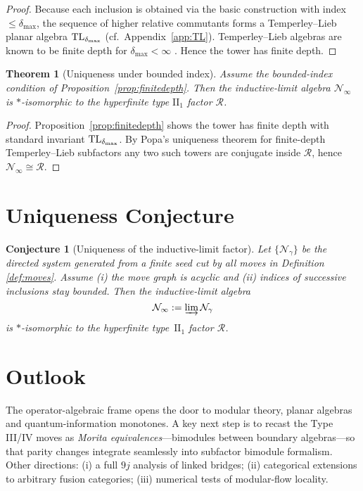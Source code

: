 \documentclass[11pt]{article}
\newtheorem{theorem}{Theorem}[section]
\newtheorem{conjecture}{Conjecture}[section]
\begin{document}
\begin{proof}
Because each inclusion is obtained via the basic construction with
index $\le\delta_{\max}$, the sequence of higher relative commutants
forms a Temperley--Lieb planar algebra ${\rm TL}_{\delta_{\max}}$
(cf.\ Appendix~\ref{app:TL}).  
Temperley--Lieb algebras are known to be finite depth for 
$\delta_{\max}\!<\!\infty$ \cite[Prop.~2.2]{JonesTL}.  Hence the tower
has finite depth.
\end{proof}

\begin{theorem}[Uniqueness under bounded index]\label{thm:unique}
Assume the bounded-index condition of Proposition~\ref{prop:finitedepth}.
Then the inductive-limit algebra $\mathcal N_{\infty}$ is
$*$-isomorphic to the hyperfinite type $\mathrm{II}_1$ factor
$\mathcal R$.
\end{theorem}

\begin{proof}
Proposition~\ref{prop:finitedepth} shows the tower has finite depth with
standard invariant ${\rm TL}_{\delta_{\max}}$.
By Popa’s uniqueness theorem for finite-depth Temperley–Lieb
subfactors \cite{PopaCBMS} any two such towers are conjugate inside
$\mathcal R$, hence $\mathcal N_{\infty}\cong\mathcal R$.
\end{proof}

\section{Uniqueness Conjecture}

\begin{conjecture}[Uniqueness of the inductive-limit factor]\label{conj:unique}
Let $\{\mathcal N_{\gamma}\}$ be the directed system generated from a finite seed
cut by all moves in Definition \ref{def:moves}.  Assume (i) the move graph is
acyclic and (ii) indices of successive inclusions stay bounded.  Then the
inductive-limit algebra
\[
  \mathcal N_{\infty}:=\varinjlim\mathcal N_{\gamma}
\]
is $*$-isomorphic to the hyperfinite type~$\mathrm{II}_1$ factor $\mathcal R$.
\end{conjecture}

\section{Outlook}
The operator-algebraic frame opens the door to modular theory, planar
algebras and quantum-information monotones.  A key next step is to recast the
Type III/IV moves as \emph{Morita equivalences}—bimodules between boundary
algebras—so that parity changes integrate seamlessly into subfactor bimodule
formalism.  Other directions: (i) a full $9j$ analysis of linked bridges; (ii)
categorical extensions to arbitrary fusion categories; (iii) numerical tests of
modular-flow locality.
\end{document}
